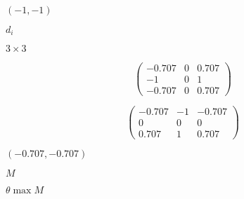 \documentclass{article}
\begin{document}
$(-1, -1)$
\pagebreak

$d_i$
\pagebreak

$3 \times 3$
\pagebreak

\[ \left( \begin{array}{ccc} -0.707 & 0 & 0.707 \\ -1 & 0 & 1 \\ -0.707 & 0 & 0.707 \end{array} \right) \]
\pagebreak

\[ \left( \begin{array}{ccc} -0.707 & -1 & -0.707 \\ 0 & 0 & 0 \\ 0.707 & 1 & 0.707 \end{array} \right) \]
\pagebreak

$(-0.707, -0.707)$
\pagebreak

$ M $
\pagebreak

$ \theta \max M $
\pagebreak
\end{document}
